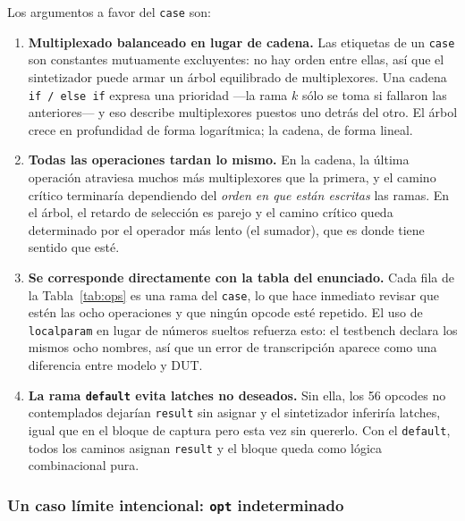 \documentclass[12pt,a4paper]{article}
\begin{document}
Los argumentos a favor del \texttt{case} son:

\begin{enumerate}[leftmargin=2em,itemsep=0.3em]
  \item \textbf{Multiplexado balanceado en lugar de cadena.} Las etiquetas de un
        \texttt{case} son constantes mutuamente excluyentes: no hay orden entre
        ellas, así que el sintetizador puede armar un árbol equilibrado de
        multiplexores. Una cadena \texttt{if / else if} expresa una prioridad
        —la rama $k$ sólo se toma si fallaron las anteriores— y eso describe
        multiplexores puestos uno detrás del otro. El árbol crece en
        profundidad de forma logarítmica; la cadena, de forma lineal.

  \item \textbf{Todas las operaciones tardan lo mismo.} En la cadena, la última
        operación atraviesa muchos más multiplexores que la primera, y el camino
        crítico terminaría dependiendo del \emph{orden en que están escritas} las
        ramas. En el árbol, el retardo de selección es parejo y el camino crítico
        queda determinado por el operador más lento (el sumador), que es donde
        tiene sentido que esté.

  \item \textbf{Se corresponde directamente con la tabla del enunciado.} Cada
        fila de la Tabla~\ref{tab:ops} es una rama del \texttt{case}, lo que
        hace inmediato revisar que estén las ocho operaciones y que ningún
        opcode esté repetido. El uso de \texttt{localparam} en lugar de números
        sueltos refuerza esto: el testbench declara los mismos ocho nombres, así
        que un error de transcripción aparece como una diferencia entre modelo y
        DUT.

  \item \textbf{La rama \texttt{default} evita latches no deseados.} Sin ella,
        los 56 opcodes no contemplados dejarían \texttt{result} sin asignar y el
        sintetizador inferiría latches, igual que en el bloque de captura pero
        esta vez sin quererlo. Con el \texttt{default}, todos los caminos
        asignan \texttt{result} y el bloque queda como lógica combinacional
        pura.
\end{enumerate}

\subsubsection{Un caso límite intencional: \texttt{opt} indeterminado}
\end{document}
